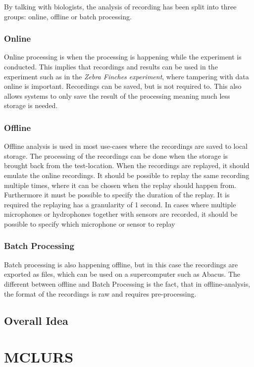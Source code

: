 By talking with biologists, the analysis of recording has been split into three groups: online, offline or batch processing.
\subsubsection{Online}\label{sec:usecase:online}
Online processing is when the processing is happening while the experiment is conducted. This implies that recordings and results can be used in the experiment such as in the \textit{Zebra Finches experiment}, where tampering with data online is important. Recordings can be saved, but is not required to. This also allows systems to only save the result of the processing meaning much less storage is needed.

\subsubsection{Offline}
Offline analysis is used in most use-cases where the recordings are saved to local storage. The processing of the recordings can be done when the storage is brought back from the test-location. When the recordings are replayed, it should emulate the online recordings.
It should be possible to replay the same recording multiple times, where it can be chosen when the replay should happen from. Furthermore it must be possible to specify the duration of the replay. It is required the replaying has a granularity of 1 second. In cases where multiple microphones or hydrophones together with sensors are recorded, it should be possible to specify which microphone or sensor to replay

\subsubsection{Batch Processing}
Batch processing is also happening offline, but in this case the recordings are exported as  files, which can be used on a supercomputer such as Abacus. The different between offline and Batch Processing is the fact, that in offline-analysis, the format of the recordings is raw and requires pre-processing.

\subsection{Overall Idea}



\section{MCLURS}

